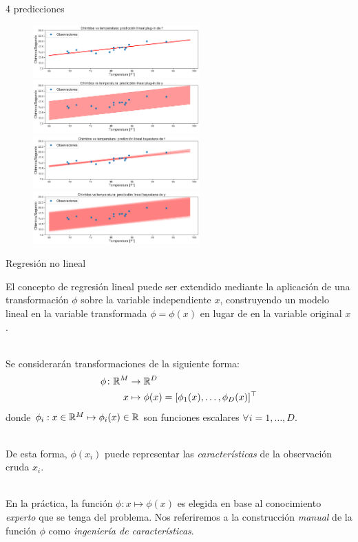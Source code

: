 \documentclass[9pt, handout]{beamer}
\begin{document}
\begin{frame}{4 predicciones}

\begin{figure}[H]
	\centering
	\includegraphics[width=0.57\textwidth]{../img/cap2_chirridos_pred1}
	\includegraphics[width=0.57\textwidth]{../img/cap2_chirridos_pred2}
	\includegraphics[width=0.57\textwidth]{../img/cap2_chirridos_pred3}
	\includegraphics[width=0.57\textwidth]{../img/cap2_chirridos_pred4}
\end{figure}
	
\end{frame}

\begin{frame}{Regresión no lineal}

El concepto de regresión lineal puede ser extendido mediante la aplicación de una transformación $\phi$ sobre la variable independiente $x$, construyendo un modelo lineal en la variable transformada $\phi=\phi(x)$ en lugar de en la variable original $x$. \\~\ \pause

Se considerarán transformaciones de la siguiente forma:
\begin{align*}
  \phi \colon \mathbb{R}^M &\to \mathbb{R}^D\\
  x &\mapsto \phi(x)=[\phi_1(x),\ldots,\phi_D(x)]^\top
\end{align*}
donde $\phi_i: x\in\mathbb{R}^M \mapsto \phi_i(x)\in\mathbb{R}$ son funciones escalares $\forall i=1,\ldots,D$.\\~\ \pause

De esta forma, $\phi(x_i)$ puede representar las \emph{características} de la observación cruda $x_i$.\\~\ \pause

En la práctica, la función $\phi:x\mapsto\phi(x)$ es elegida en base  al conocimiento \emph{experto} que se tenga del problema. Nos referiremos a la construcción \emph{manual} de la función $\phi$ como \emph{ingeniería de características}.
	
\end{frame}
\end{document}
